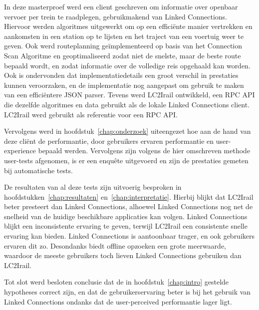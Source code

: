 In deze masterproef werd een client geschreven om informatie over openbaar vervoer per trein te raadplegen, gebruikmakend van Linked Connections. Hiervoor werden algoritmes uitgewerkt om op een efficiënte manier vertrekken en aankomsten in een station op te lijsten en het traject van een voertuig weer te geven. Ook werd routeplanning geïmplementeerd op basis van het Connection Scan Algoritme en geoptimaliseerd zodat niet de snelste, maar de beste route bepaald wordt, en zodat informatie over de volledige reis opgehaald kan worden. Ook is ondervonden dat implementatiedetails een groot verschil in prestaties kunnen veroorzaken, en de implementatie nog aangepast om gebruik te maken van een efficiëntere JSON parser. Tevens werd LC2Irail ontwikkeld, een RPC API die dezelfde algoritmes en data gebruikt als de lokale Linked Connections client. LC2Irail werd gebruikt als referentie voor een RPC API.
	
Vervolgens werd in hoofdstuk~\ref{chap:onderzoek} uiteengezet hoe aan de hand van deze cliënt de performantie, door gebruikers ervaren performantie en user-experience bepaald werden. Vervolgens zijn volgens de hier omschreven methode user-tests afgenomen, is er een enquête uitgevoerd en zijn de prestaties gemeten bij automatische tests. 
	
De resultaten van al deze tests zijn uitvoerig besproken in hoofdstukken~\ref{chap:resultaten} en~\ref{chap:interpretatie}. Hierbij blijkt dat LC2Irail beter presteert dan Linked Connections, alhoewel Linked Connections nog net de snelheid van de huidige beschikbare applicaties kan volgen. Linked Connections blijkt een inconsistente ervaring te geven, terwijl LC2Irail een consistente snelle ervaring kan bieden. Linked Connections is aantoonbaar trager, en ook gebruikers ervaren dit zo. Desondanks biedt offline opzoeken een grote meerwaarde, waardoor de meeste gebruikers toch lieven Linked Connections gebruiken dan LC2Irail.
	
Tot slot werd besloten conclusie dat de in hoofdstuk~\ref{chap:intro} gestelde hypotheses correct zijn, en dat de gebruikerservaring beter is bij het gebruik van Linked Connections ondanks dat de user-perceived performantie lager ligt.